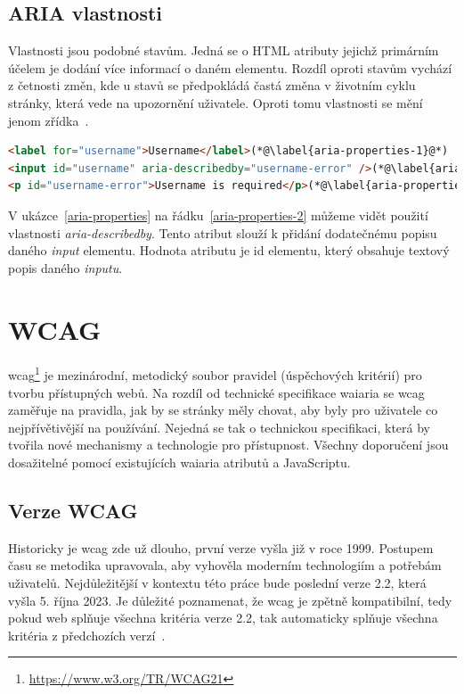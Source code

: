 \subsection{ARIA vlastnosti}

Vlastnosti jsou podobné stavům.
Jedná se o HTML atributy jejichž primárním účelem je dodání více informací o daném elementu.
Rozdíl oproti stavům vychází z četnosti změn, kde u stavů se předpokládá častá změna v životním cyklu stránky, která vede na upozornění uživatele.
Oproti tomu vlastnosti se mění jenom zřídka~\cite[sekce 6.1]{wai-aria}.

\begin{lstlisting}[caption={Aria vlastnosti}, label={aria-properties}, language=html]
<label for="username">Username</label>(*@\label{aria-properties-1}@*)
<input id="username" aria-describedby="username-error" />(*@\label{aria-properties-2}@*)
<p id="username-error">Username is required</p>(*@\label{aria-properties-3}@*)
\end{lstlisting}

V ukázce~\ref{aria-properties} na řádku~\ref{aria-properties-2} můžeme vidět použití vlastnosti \textit{aria-describedby}.
Tento atribut slouží k přidání dodatečnému popisu daného \textit{input} elementu. Hodnota atributu je id elementu, který obsahuje textový popis daného \textit{inputu}.

\section{WCAG}

\gls{wcag}\footnote{\url{https://www.w3.org/TR/WCAG21}} je mezinárodní, metodický soubor pravidel (úspěchových kritérií) pro tvorbu přístupných webů.
Na rozdíl od technické specifikace \gls{waiaria} se \gls{wcag} zaměřuje na pravidla, jak by se stránky měly chovat, aby byly pro uživatele co nejpřívětivější na používání.
Nejedná se tak o technickou specifikaci, která by tvořila nové mechanismy a technologie pro přístupnost.
Všechny doporučení jsou dosažitelné pomocí existujících \gls{waiaria} atributů a JavaScriptu.

\subsection{Verze WCAG}

Historicky je \gls{wcag} zde už dlouho, první verze vyšla již v roce 1999.
Postupem času se metodika upravovala, aby vyhověla moderním technologiím a potřebám uživatelů.
Nejdůležitější v kontextu této práce bude poslední verze 2.2, která vyšla 5. října 2023.
Je důležité poznamenat, že \gls{wcag} je zpětně kompatibilní, tedy pokud web splňuje všechna kritéria verze 2.2, tak automaticky splňuje všechna kritéria z předchozích verzí~\cite{wcag}.

